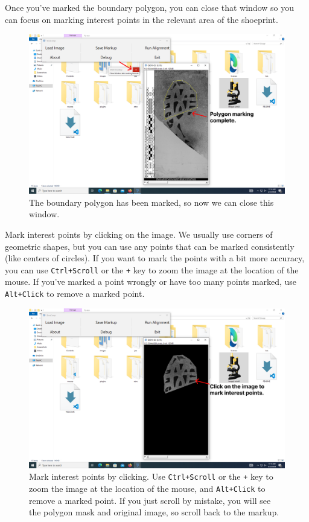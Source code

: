 \documentclass[a4paper, oneside]{memoir}
\begin{document}
Once you've marked the boundary polygon, you can close that window so you can focus on
marking interest points in the relevant area of the shoeprint.

\begin{figure}[H]
\begin{center}
	\includegraphics[width=0.8\linewidth]{images/step_4c-anno.png}
\end{center}
\caption{The boundary polygon has been marked, so now we can close this window.}
\label{fig:step4c}
\end{figure}

Mark interest points by clicking on the image. We usually use corners of geometric shapes,
but you can use any points that can be marked consistently (like centers of circles). If
you want to mark the points with a bit more accuracy, you can use \texttt{Ctrl+Scroll} or
the \texttt{+} key to zoom the image at the location of the mouse. If you've marked a
point wrongly or have too many points marked, use \texttt{Alt+Click} to remove a marked
point.

\begin{figure}[H]
\begin{center}
	\includegraphics[width=0.8\linewidth]{images/step_4d-anno.png}
\end{center}
\caption{Mark interest points by clicking. Use \texttt{Ctrl+Scroll} or the \texttt{+} key
	to zoom the image at the location of the mouse, and \texttt{Alt+Click} to remove a marked
point. If you just scroll by mistake, you will see the polygon mask and original image, so
scroll back to the markup.}
\label{fig:step4d}
\end{figure}
\end{document}
